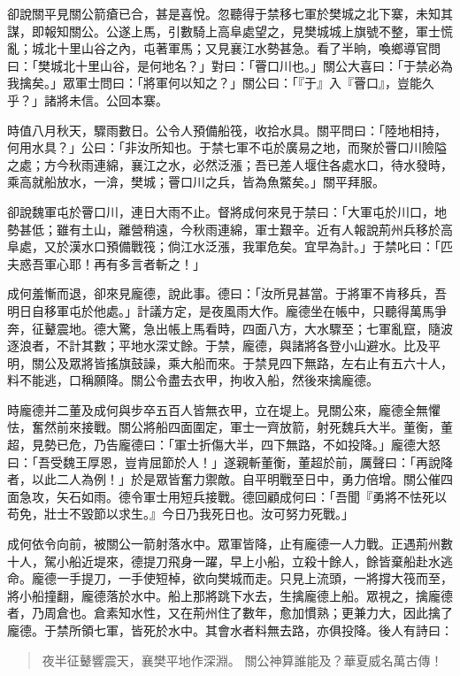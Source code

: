 卻說關平見關公箭瘡已合，甚是喜悅。忽聽得于禁移七軍於樊城之北下寨，未知其謀，即報知關公。公遂上馬，引數騎上高阜處望之，見樊城城上旗號不整，軍士慌亂；城北十里山谷之內，屯著軍馬；又見襄江水勢甚急。看了半晌，喚鄉導官問曰：「樊城北十里山谷，是何地名？」對曰：「罾口川也。」關公大喜曰：「于禁必為我擒矣。」眾軍士問曰：「將軍何以知之？」關公曰：「『于』入『罾口』，豈能久乎？」諸將未信。公回本寨。

時值八月秋天，驟雨數日。公令人預備船筏，收拾水具。關平問曰：「陸地相持，何用水具？」公曰：「非汝所知也。于禁七軍不屯於廣易之地，而聚於罾口川險隘之處；方今秋雨連綿，襄江之水，必然泛漲；吾已差人堰住各處水口，待水發時，乘高就船放水，一渰，樊城；罾口川之兵，皆為魚鱉矣。」關平拜服。

卻說魏軍屯於罾口川，連日大雨不止。督將成何來見于禁曰：「大軍屯於川口，地勢甚低；雖有土山，離營稍遠，今秋雨連綿，軍士艱辛。近有人報說荊州兵移於高阜處，又於漢水口預備戰筏；倘江水泛漲，我軍危矣。宜早為計。」于禁叱曰：「匹夫惑吾軍心耶！再有多言者斬之！」

成何羞慚而退，卻來見龐德，說此事。德曰：「汝所見甚當。于將軍不肯移兵，吾明日自移軍屯於他處。」計議方定，是夜風雨大作。龐德坐在帳中，只聽得萬馬爭奔，征鼙震地。德大驚，急出帳上馬看時，四面八方，大水驟至；七軍亂竄，隨波逐浪者，不計其數；平地水深丈餘。于禁，龐德，與諸將各登小山避水。比及平明，關公及眾將皆搖旗鼓譟，乘大船而來。于禁見四下無路，左右止有五六十人，料不能逃，口稱願降。關公令盡去衣甲，拘收入船，然後來擒龐德。

時龐德并二董及成何與步卒五百人皆無衣甲，立在堤上。見關公來，龐德全無懼怯，奮然前來接戰。關公將船四面圍定，軍士一齊放箭，射死魏兵大半。董衡，董超，見勢已危，乃告龐德曰：「軍士折傷大半，四下無路，不如投降。」龐德大怒曰：「吾受魏王厚恩，豈肯屈節於人！」遂親斬董衡，董超於前，厲聲曰：「再說降者，以此二人為例！」於是眾皆奮力禦敵。自平明戰至日中，勇力倍增。關公催四面急攻，矢石如雨。德令軍士用短兵接戰。德回顧成何曰：「吾聞『勇將不怯死以苟免，壯士不毀節以求生。』今日乃我死日也。汝可努力死戰。」

成何依令向前，被關公一箭射落水中。眾軍皆降，止有龐德一人力戰。正遇荊州數十人，駕小船近堤來，德提刀飛身一躍，早上小船，立殺十餘人，餘皆棄船赴水逃命。龐德一手提刀，一手使短棹，欲向樊城而走。只見上流頭，一將撐大筏而至，將小船撞翻，龐德落於水中。船上那將跳下水去，生擒龐德上船。眾視之，擒龐德者，乃周倉也。倉素知水性，又在荊州住了數年，愈加慣熟；更兼力大，因此擒了龐德。于禁所領七軍，皆死於水中。其會水者料無去路，亦俱投降。後人有詩曰：

\begin{quote}
夜半征鼙響震天，襄樊平地作深淵。
關公神算誰能及？華夏威名萬古傳！
\end{quote}

